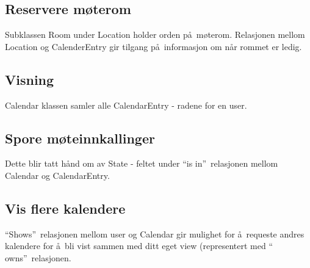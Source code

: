 \documentclass{article}
\begin{document}
\subsection{Reservere m\o terom}

Subklassen Room under Location holder orden p\aa\ m\o terom. Relasjonen
mellom Location og CalenderEntry gir tilgang p\aa\ informasjon om n\aa r
rommet er ledig.

\subsection{Visning}

Calendar klassen samler alle CalendarEntry - radene for en user.

\subsection{Spore m\o teinnkallinger}

Dette blir tatt h\aa nd om av State - feltet under \textquotedblleft is
in\textquotedblright\ relasjonen mellom Calendar og CalendarEntry.

\subsection{Vis flere kalendere}

\textquotedblleft Shows\textquotedblright\ relasjonen mellom user og
Calendar gir mulighet for \aa\ requeste andres kalendere for \aa\ bli vist
sammen med ditt eget view (representert med \textquotedblleft
owns\textquotedblright\ relasjonen.
\end{document}
